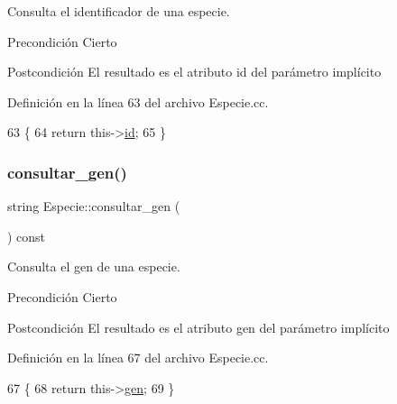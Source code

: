 Consulta el identificador de una especie. 

\begin{DoxyPrecond}{Precondición}
Cierto 
\end{DoxyPrecond}
\begin{DoxyPostcond}{Postcondición}
El resultado es el atributo id del parámetro implícito 
\end{DoxyPostcond}


Definición en la línea 63 del archivo Especie.\+cc.


\begin{DoxyCode}
63                                    \{
64   \textcolor{keywordflow}{return} this->\hyperlink{class_especie_a91b94109fb8a456bba7199cdda36d588}{id};
65 \}
\end{DoxyCode}
\mbox{\label{class_especie_a850af2b59a21e2d801c59d76ba5c1a98}} 
\subsubsection{\texorpdfstring{consultar\+\_\+gen()}{consultar\_gen()}}
{\footnotesize\ttfamily string Especie\+::consultar\+\_\+gen (\begin{DoxyParamCaption}{ }\end{DoxyParamCaption}) const}



Consulta el gen de una especie. 

\begin{DoxyPrecond}{Precondición}
Cierto 
\end{DoxyPrecond}
\begin{DoxyPostcond}{Postcondición}
El resultado es el atributo gen del parámetro implícito 
\end{DoxyPostcond}


Definición en la línea 67 del archivo Especie.\+cc.


\begin{DoxyCode}
67                                     \{
68   \textcolor{keywordflow}{return} this->\hyperlink{class_especie_ac35bb565f7346cd6317b3a8c849456d1}{gen};
69 \}
\end{DoxyCode}
\mbox{\label{class_especie_aeae80a0aef28e0ae808ad315a0b65408}} 
